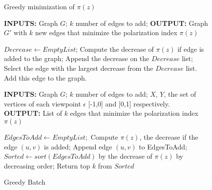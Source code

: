 \begin{figure}
  \begin{minipage}[b]{1\linewidth}
    \begin{algorithm}[H]
	\caption{Greedy minimization of $\pi(z)$}
	\label{alg:greedyAlgo}
	\begin{flushleft}
        		\textbf{INPUTS:} Graph $G$; $k$ number of edges to add;
		\vspace{6pt}
        		\textbf{OUTPUT:} Graph $G'$ with $k$ new edges that minimize the polarization index $\pi(z)$
	\end{flushleft}
	\begin{algorithmic}[1]
		\FOR {$i = 1:k \ $}
		\STATE$Decrease \leftarrow Empty List$;
			\FOR { each  edge in $|V| \times |V| \textbackslash E$}
				\STATE Compute the decrease of $\pi(z)$ if edge is added to the graph;
				\STATE Append the decrease on the $Decrease$ list;
			\ENDFOR
		\STATE Select the edge with the largest decrease from the $Decrease$ list.
		\STATE Add this edge to the graph.
		\ENDFOR
	\end{algorithmic}
\end{algorithm}
\bigskip
  \end{minipage}
  \begin{minipage}[b]{1\linewidth}
     \begin{algorithm}[H]
	\caption{Greedy Batch}
	\label{alg:greedyBatch}
	\begin{flushleft}
        		\textbf{INPUTS:} Graph $G$; $k$ number of edges to add;
		$X$, $Y $, the set of vertices of each viewpoint $\epsilon$ [-1,0] and [0,1] respectively.\\
		\vspace{6pt}
        		\textbf{OUTPUT:} List of $k$ edges that minimize the polarization index $\pi(z)$
	\end{flushleft}
	\begin{algorithmic}[1]
		\STATE $EdgesToAdd \leftarrow Empty List;$
		\STATE Compute $\pi(z)$, the decrease if the edge $(u,v)$ is added;
		\STATE Append edge $(u,v)$ to EdgesToAdd;
		\ENDFOR
				\STATE $Sorted \leftarrow sort(EdgesToAdd)$ by the decrease of $\pi(z)$ by decreasing order;
		\STATE Return top $k$ from $Sorted$
	\end{algorithmic}
\end{algorithm}

  \end{minipage}%
\end{figure}
\vspace{10pt}

